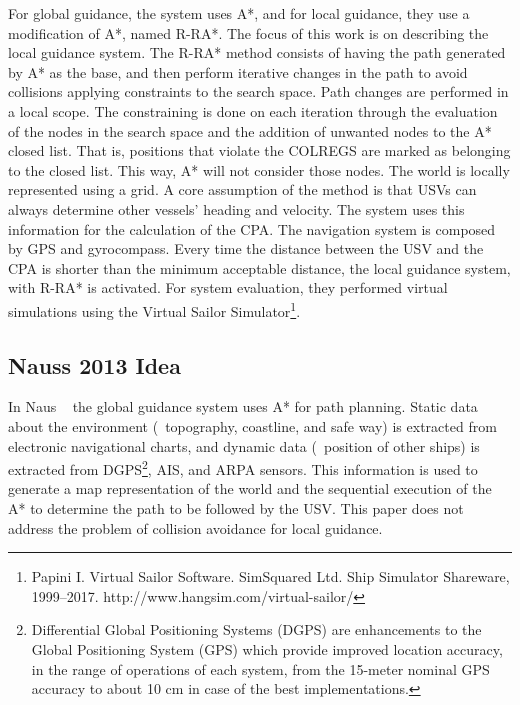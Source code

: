     For global guidance, the system uses A*, and for local guidance, they use a modification of A*, named \ac{R-RA*}. The focus of this work is on describing the local guidance system. The \ac{R-RA*} method consists of having the path generated by A* as the base, and then perform iterative changes in the path to avoid collisions applying constraints to the search space. Path changes are performed in a local scope. The constraining is done on each iteration through the evaluation of the nodes in the search space and the addition of unwanted nodes to the A* closed list. That is, positions that violate the \ac{COLREGS} are marked as belonging to the closed list. This way, A* will not consider those nodes. The world is locally represented using a grid. A core assumption of the method is that \ac{USV}s can always determine other vessels' heading and velocity. The system uses this information for the calculation of the \ac{CPA}. The navigation system is composed by GPS and gyrocompass. Every time the distance between the \ac{USV} and the \ac{CPA} is shorter than the minimum acceptable distance, the local guidance system, with \ac{R-RA*} is activated. For system evaluation, they performed virtual simulations using the Virtual Sailor Simulator\footnote{Papini I. Virtual Sailor Software. SimSquared Ltd. Ship Simulator Shareware, 1999–2017. http://www.hangsim.com/virtual-sailor/}.
    
    \subsection{Nauss 2013 Idea}
    In Naus \etal~\cite{Naus2013Idea} the global guidance system uses A* for path planning. 
    Static data about the environment (\ie~topography, coastline, and safe way) is extracted from electronic navigational charts, and dynamic data (\ie~position of other ships) is extracted from \ac{DGPS}\footnote{Differential Global Positioning Systems (DGPS) are enhancements to the Global Positioning System (GPS) which provide improved location accuracy, in the range of operations of each system, from the 15-meter nominal GPS accuracy to about 10 cm in case of the best implementations.}, \ac{AIS}, and \ac{ARPA} sensors. This information is used to generate a map representation of the world and the sequential execution of the A* to determine the path to be followed by the \ac{USV}. This paper does not address the problem of collision avoidance for local guidance.
    

